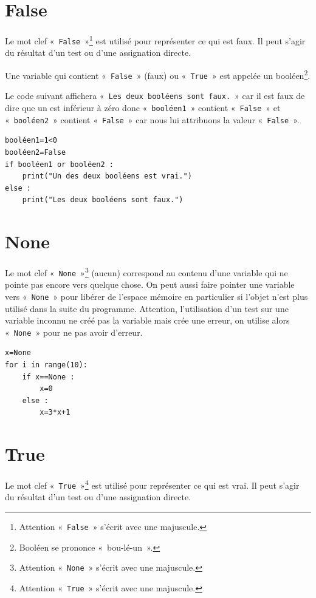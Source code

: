 \section*{False}
Le mot clef « \texttt{False} »\footnote{Attention « \texttt{False} » s'écrit avec une majuscule.} est utilisé pour représenter ce qui est faux. Il peut s'agir du résultat d'un test ou d'une assignation directe.

Une variable qui contient « \texttt{False} » (faux) ou « \texttt{True} » est appelée un booléen\footnote{Booléen se prononce « bou-lé-un ».}.  

Le code suivant affichera « \texttt{Les deux booléens sont faux.} » car il est faux de dire que un est inférieur à zéro donc « \texttt{booléen1} » contient « \texttt{False} » et « \texttt{booléen2} » contient « \texttt{False} » car nous lui attribuons la valeur « \texttt{False} ».
  
\begin{Verbatim}[frame=single,rulecolor=\color{gray}]
booléen1=1<0
booléen2=False
if booléen1 or booléen2 :
    print("Un des deux booléens est vrai.")
else :
	print("Les deux booléens sont faux.")
\end{Verbatim}

\section*{None}
Le mot clef « \texttt{None} »\footnote{Attention « \texttt{None} » s'écrit avec une majuscule.} (aucun) correspond au contenu d'une variable qui ne pointe pas encore vers quelque chose. On peut aussi faire pointer une variable vers « \texttt{None} » pour libérer de l'espace mémoire en particulier si l'objet n'est plus utilisé dans la suite du programme. Attention, l'utilisation d'un test sur une variable inconnu ne créé pas la variable mais crée une erreur, on utilise alors « \texttt{None} » pour ne pas avoir d'erreur.


\begin{Verbatim}[frame=single,rulecolor=\color{gray}]
x=None
for i in range(10):
    if x==None :
        x=0
    else :
        x=3*x+1
\end{Verbatim}
 
\section*{True}
Le mot clef « \texttt{True} »\footnote{Attention « \texttt{True} » s'écrit avec une majuscule.} est utilisé pour représenter ce qui est vrai. Il peut s'agir du résultat d'un test ou d'une assignation directe.

